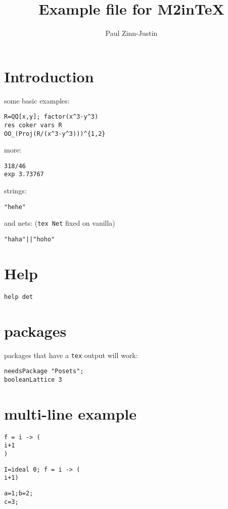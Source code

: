 \documentclass[12pt,a4paper]{amsart}
\title{Example file for M2inTeX}
\author{Paul Zinn-Justin}
\begin{document}
\maketitle

\section{Introduction}
some basic examples:
\begin{verbatim}
R=QQ[x,y]; factor(x^3-y^3)
res coker vars R
OO_(Proj(R/(x^3-y^3)))^{1,2}
\end{verbatim}
more:
\begin{verbatim}
318/46
exp 3.73767
\end{verbatim}
strings:
\begin{verbatim}
"hehe"
\end{verbatim}
and nets: ({\tt tex Net} fixed on vanilla)
\begin{verbatim}
"haha"||"hoho"
\end{verbatim}

\section{Help}
\begin{verbatim}
help det
\end{verbatim}

\section{packages}
packages that have a {\tt tex} output will work:
\begin{verbatim}
needsPackage "Posets";
booleanLattice 3
\end{verbatim}

\section{multi-line example}
\begin{verbatim}
f = i -> (
i+1
)
\end{verbatim}


\begin{verbatim}
I=ideal 0; f = i -> (
i+1)
\end{verbatim}

\begin{verbatim}
a=1;b=2;
c=3;
\end{verbatim}
\end{document}
